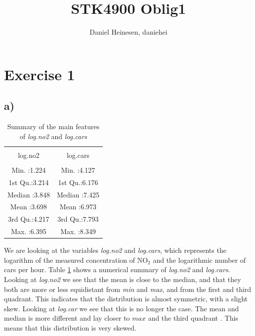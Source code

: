 \documentclass[a4paper,norsk, 10pt]{article}
\title{STK4900 Oblig1}
\author{Daniel Heinesen, daniehei}
\begin{document}
\maketitle




\section*{Exercise 1}



\subsection*{a)}
\begin{table}[ht]
\centering
\begin{tabular}{cc}
\\[-1.8ex]\hline 
\hline \\[-1.8ex]
log.no2 &    log.cars  \\ 
\hline \\[-1.8ex] 
Min.   :1.224   & Min.   :4.127  \\ 
1st Qu.:3.214   & 1st Qu.:6.176  \\ 
Median :3.848   & Median :7.425   \\ 
Mean   :3.698   & Mean   :6.973   \\ 
3rd Qu.:4.217   & 3rd Qu.:7.793   \\ 
Max.   :6.395   & Max.   :8.349     \\ 
   \hline
\end{tabular}
\caption{Summary of the main features of \textit{log.no2} and \textit{log.cars}}\label{tab:sum_no2_cars}
\end{table}



We are looking at the variables \textit{log.no2} and \textit{log.cars}, which represents the logarithm of the measured concentration of NO$_{2}$ and the logarithmic number of cars per hour. Table \ref{tab:sum_no2_cars} shows a numerical summary of \textit{log.no2} and \textit{log.cars}. Looking at \textit{log.no2} we see that the mean is close to the median, and that they both are more or less equidistant from \textit{min} and \textit{max}, and from the first and third quadrant. This indicates that the distribution is almost symmetric, with a slight skew. Looking at \textit{log.car} we see that this is no longer the case. The mean and median is more different and lay closer to $max$ and the third quadrant . This means that this distribution is very skewed.
\end{document}
